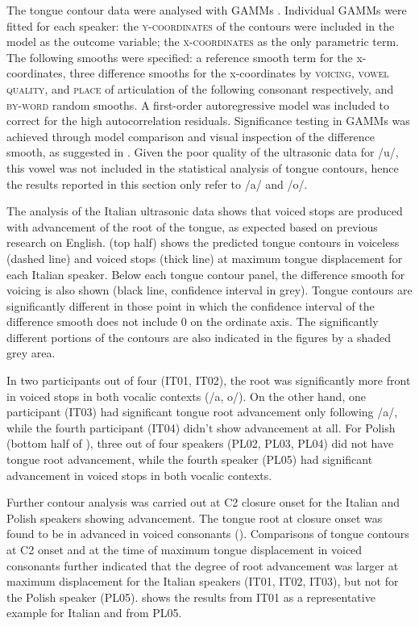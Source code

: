 \documentclass[authoryear, twocolumn]{elsarticle}
\begin{document}
The tongue contour data were analysed with GAMMs \citep{wood2006}.
Individual GAMMs were fitted for each speaker: the
\textsc{y-coordinates} of the contours were included in the model as the
outcome variable; the \textsc{x-coordinates} as the only parametric
term. The following smooths were specified: a reference smooth term for
the x-coordinates, three difference smooths for the x-coordinates by
\textsc{voicing}, \textsc{vowel quality}, and \textsc{place} of
articulation of the following consonant respectively, and
\textsc{by-word} random smooths. A first-order autoregressive model was
included to correct for the high autocorrelation residuals. Significance
testing in GAMMs was achieved through model comparison and visual
inspection of the difference smooth, as suggested in
\citep{soskuthy2017}. Given the poor quality of the ultrasonic data for
/u/, this vowel was not included in the statistical analysis of tongue
contours, hence the results reported in this section only refer to /a/
and /o/.

The analysis of the Italian ultrasonic data shows that voiced stops are
produced with advancement of the root of the tongue, as expected based
on previous research on English.  (top half) shows the
predicted tongue contours in voiceless (dashed line) and voiced stops
(thick line) at maximum tongue displacement for each Italian speaker.
Below each tongue contour panel, the difference smooth for voicing is
also shown (black line, confidence interval in grey). Tongue contours
are significantly different in those point in which the confidence
interval of the difference smooth does not include 0 on the ordinate
axis. The significantly different portions of the contours are also
indicated in the figures by a shaded grey area.

In two participants out of four (IT01, IT02), the root was significantly
more front in voiced stops in both vocalic contexts (/a, o/). On the
other hand, one participant (IT03) had significant tongue root
advancement only following /a/, while the fourth participant (IT04)
didn't show advancement at all. For Polish (bottom half of
), three out of four speakers (PL02, PL03, PL04) did not
have tongue root advancement, while the fourth speaker (PL05) had
significant advancement in voiced stops in both vocalic contexts.

Further contour analysis was carried out at C2 closure onset for the
Italian and Polish speakers showing advancement. The tongue root at
closure onset was found to be in advanced in voiced consonants ().
Comparisons of tongue contours at C2 onset and at the time of maximum
tongue displacement in voiced consonants further indicated that the
degree of root advancement was larger at maximum displacement for the
Italian speakers (IT01, IT02, IT03), but not for the Polish speaker
(PL05).  shows the results from IT01 as a representative
example for Italian and from PL05.
\end{document}
